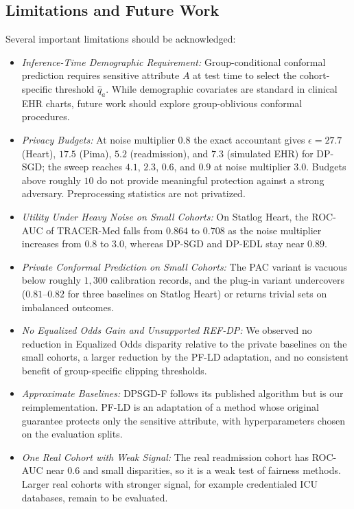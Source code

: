 \documentclass[3p,12pt]{elsarticle}
\theoremstyle{plain}
\theoremstyle{definition}
\begin{document}
\subsection{Limitations and Future Work}
Several important limitations should be acknowledged:
\begin{itemize}
    \item \emph{Inference-Time Demographic Requirement:} Group-conditional conformal prediction requires sensitive attribute $A$ at test time to select the cohort-specific threshold $\hat{q}_a$. While demographic covariates are standard in clinical EHR charts, future work should explore group-oblivious conformal procedures.
    \item \emph{Privacy Budgets:} At noise multiplier $0.8$ the exact accountant gives $\epsilon = 27.7$ (Heart), $17.5$ (Pima), $5.2$ (readmission), and $7.3$ (simulated EHR) for DP-SGD; the sweep reaches $4.1$, $2.3$, $0.6$, and $0.9$ at noise multiplier $3.0$. Budgets above roughly $10$ do not provide meaningful protection against a strong adversary. Preprocessing statistics are not privatized.
    \item \emph{Utility Under Heavy Noise on Small Cohorts:} On Statlog Heart, the ROC-AUC of TRACER-Med falls from $0.864$ to $0.708$ as the noise multiplier increases from $0.8$ to $3.0$, whereas DP-SGD and DP-EDL stay near $0.89$.
    \item \emph{Private Conformal Prediction on Small Cohorts:} The PAC variant is vacuous below roughly $1{,}300$ calibration records, and the plug-in variant undercovers ($0.81$--$0.82$ for three baselines on Statlog Heart) or returns trivial sets on imbalanced outcomes.
    \item \emph{No Equalized Odds Gain and Unsupported REF-DP:} We observed no reduction in Equalized Odds disparity relative to the private baselines on the small cohorts, a larger reduction by the PF-LD adaptation, and no consistent benefit of group-specific clipping thresholds.
    \item \emph{Approximate Baselines:} DPSGD-F follows its published algorithm but is our reimplementation. PF-LD is an adaptation of a method whose original guarantee protects only the sensitive attribute, with hyperparameters chosen on the evaluation splits.
    \item \emph{One Real Cohort with Weak Signal:} The real readmission cohort has ROC-AUC near $0.6$ and small disparities, so it is a weak test of fairness methods. Larger real cohorts with stronger signal, for example credentialed ICU databases, remain to be evaluated.

\end{itemize}
\end{document}
